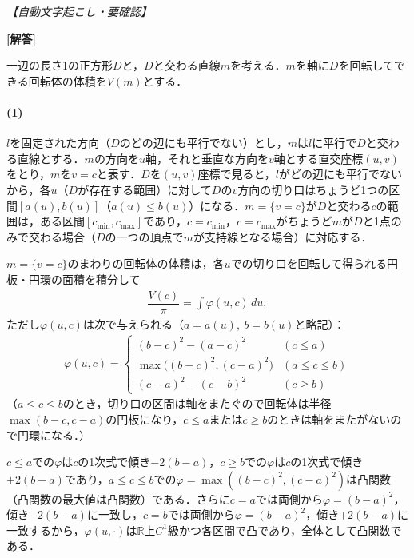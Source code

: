 \documentclass[../../main.tex]{subfiles}
\begin{document}
\begin{oframed}
  
\end{oframed}

\begin{flushright}
  \footnotesize\textit{【自動文字起こし・要確認】}
\end{flushright}

{\bf [解答]}

一辺の長さ1の正方形$D$と，$D$と交わる直線$m$を考える．$m$を軸に$D$を回転してできる回転体の体積を$V(m)$とする．

\paragraph{(1)}

$l$を固定された方向（$D$のどの辺にも平行でない）とし，$m$は$l$に平行で$D$と交わる直線とする．$m$の方向を$u$軸，それと垂直な方向を$v$軸とする直交座標$(u,v)$をとり，$m$を$v=c$と表す．$D$を$(u,v)$座標で見ると，$l$がどの辺にも平行でないから，各$u$（$D$が存在する範囲）に対して$D$の$v$方向の切り口はちょうど1つの区間$[a(u),b(u)]$（$a(u)\le b(u)$）になる．$m=\{v=c\}$が$D$と交わる$c$の範囲は，ある区間$[c_{\min},c_{\max}]$であり，$c=c_{\min}$，$c=c_{\max}$がちょうど$m$が$D$と1点のみで交わる場合（$D$の一つの頂点で$m$が支持線となる場合）に対応する．

$m=\{v=c\}$のまわりの回転体の体積は，各$u$での切り口を回転して得られる円板・円環の面積を積分して
\begin{align}
  \dfrac{V(c)}{\pi}=\int\varphi(u,c)\,du,
\end{align}
ただし$\varphi(u,c)$は次で与えられる（$a=a(u),\ b=b(u)$と略記）：
\begin{align}
  \varphi(u,c)=
  \begin{cases}\displaystyle
    (b-c)^2-(a-c)^2 & (c\le a)\\
    \max\bigl((b-c)^2,(c-a)^2\bigr) & (a\le c\le b)\\
    (c-a)^2-(c-b)^2 & (c\ge b)
  \end{cases}
\end{align}
（$a\le c\le b$のとき，切り口の区間は軸をまたぐので回転体は半径$\max(b-c,c-a)$の円板になり，$c\le a$または$c\ge b$のときは軸をまたがないので円環になる．）

$c\le a$での$\varphi$は$c$の1次式で傾き$-2(b-a)$，$c\ge b$での$\varphi$は$c$の1次式で傾き$+2(b-a)$であり，$a\le c\le b$での$\varphi=\max((b-c)^2,(c-a)^2)$は凸関数（凸関数の最大値は凸関数）である．さらに$c=a$では両側から$\varphi=(b-a)^2$，傾き$-2(b-a)$に一致し，$c=b$では両側から$\varphi=(b-a)^2$，傾き$+2(b-a)$に一致するから，$\varphi(u,\cdot)$は$\mathbb R$上$C^1$級かつ各区間で凸であり，全体として凸関数である．
\end{document}
